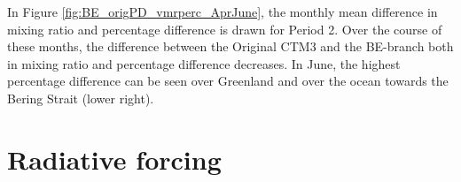 \medskip

In Figure \ref{fig:BE_origPD_vmrperc_AprJune}, the monthly mean difference in mixing ratio and percentage difference is drawn for Period 2. Over the course of these months, the difference between the Original CTM3 and the BE-branch both in mixing ratio and percentage difference decreases. In June, the highest percentage difference can be seen over Greenland and over the ocean towards the Bering Strait (lower right).















\clearpage
\section{Radiative forcing}\label{sec:res_RF}

